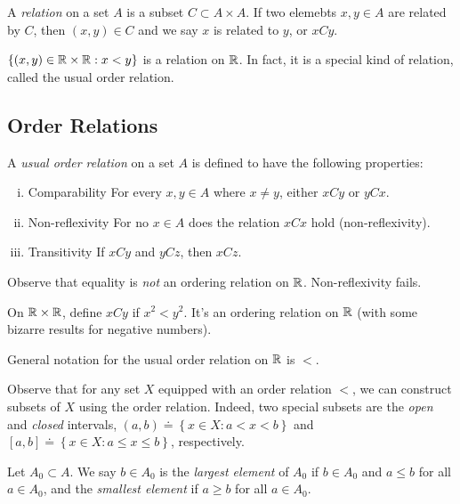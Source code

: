 \begin{definition}
	A \emph{relation} on a set $A$ is a subset $C \subset A \times A$.
	If two elemebts $x, y \in A$ are related by $C$, then $(x,y) \in C$ and 
	we say $x$ is related to $y$, or $xCy$.
\end{definition}
\begin{example}
	$\left\{ (x,y) \in \mathbb{R} \times \mathbb{R}: x<y \right\}$ is a relation on $\mathbb{R}$.
	In fact, it is a special kind of relation, called the usual order relation.
\end{example}

\subsection{Order Relations} 
\begin{definition}
	A \emph{usual order relation } on a set $A$ is defined to have the following
	properties:
	\begin{enumerate}[(i)]
		\item{Comparability} For every $x,y \in A$ where $x \neq y$, either $xCy$ or $yCx$.
		\item{Non-reflexivity} For no $x \in A$ does the relation $xCx$ hold (non-reflexivity).
		\item{Transitivity} If $xCy$ and $yCz$, then $xCz$.
	\end{enumerate}
\end{definition}
\begin{remark}\label{rem:}
	Observe that equality is \emph{not} an ordering relation on $\mathbb{R}$. Non-reflexivity
	fails.
\end{remark}
\begin{example}
	On $\mathbb{R} \times \mathbb{R}$, define $xCy$ if $x^{2} < y^{2}$. It's an ordering
	relation on $\mathbb{R}$ (with some bizarre results for negative numbers).
\end{example}
\begin{notation}
	General notation for the usual order relation on $\mathbb{R}$ is $<$.
\end{notation}
Observe that for any set $X$ equipped with an order relation $<$, we can
construct subsets of $X$ using the order relation. Indeed, two special
subsets are the \emph{open} and \emph{closed} intervals,
$(a,b)\doteq \left\{ x \in X: a < x < b \right\}$ and $[a,b] \doteq \left\{ x
	\in X: a \le x \le b
\right\}$, respectively.

Let $A_{0}  \subset A$. We say $b \in A_{0}$ is the \emph{largest element} of
$A_{0}$ if $b \in A_{0}$ and $a \le b$ for all $a \in A_{0}$, and the 
\emph{smallest element} if $a \ge b$ for all $a \in A_{0}$.

